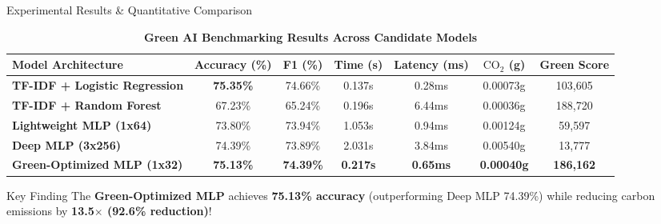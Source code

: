 \documentclass[aspectratio=169, 10pt]{beamer}
\begin{document}
\begin{frame}{Experimental Results \& Quantitative Comparison}
    \centering
    \scriptsize
    \begin{table}
        \caption{\textbf{Green AI Benchmarking Results Across Candidate Models}}
        \begin{tabular}{l c c c c c c}
            \toprule
            \textbf{Model Architecture} & \textbf{Accuracy (\%)} & \textbf{F1 (\%)} & \textbf{Time (s)} & \textbf{Latency (ms)} & \textbf{$\text{CO}_2$ (g)} & \textbf{Green Score} \\
            \midrule
            \textbf{TF-IDF + Logistic Regression} & \textbf{75.35\%} & 74.66\% & 0.137s & 0.28ms & 0.00073g & 103,605 \\
            \textbf{TF-IDF + Random Forest} & 67.23\% & 65.24\% & 0.196s & 6.44ms & 0.00036g & 188,720 \\
            \textbf{Lightweight MLP (1x64)} & 73.80\% & 73.94\% & 1.053s & 0.94ms & 0.00124g & 59,597 \\
            \textbf{Deep MLP (3x256)} & 74.39\% & 73.89\% & 2.031s & 3.84ms & 0.00540g & 13,777 \\
            \rowcolor{LightGreen} \textbf{Green-Optimized MLP (1x32)} & \textbf{75.13\%} & \textbf{74.39\%} & \textbf{0.217s} & \textbf{0.65ms} & \textbf{0.00040g} & \textbf{186,162} \\
            \bottomrule
        \end{tabular}
    \end{table}
    
    \vspace{0.1cm}
    \begin{alertblock}{Key Finding}
        The \textbf{Green-Optimized MLP} achieves \textbf{75.13\% accuracy} (outperforming Deep MLP 74.39\%) while reducing carbon emissions by \textbf{13.5$\times$ (92.6\% reduction)}!
    \end{alertblock}
\end{frame}
\end{document}
